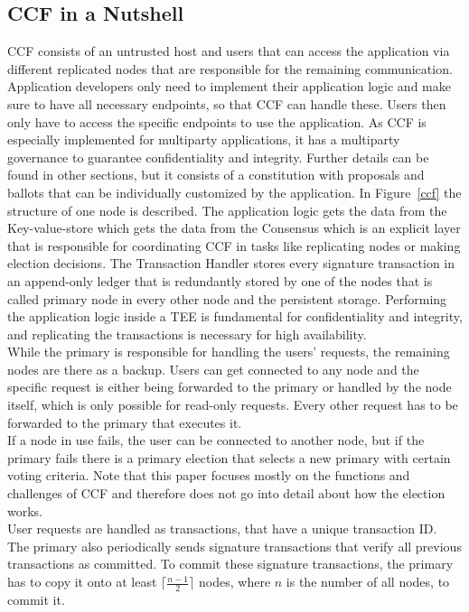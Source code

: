 \subsection{CCF in a Nutshell}
CCF consists of an untrusted host and users that can access the application via different replicated nodes that are responsible for the remaining communication. Application developers only need to implement their application logic and make sure to have all necessary endpoints, so that CCF can handle these. Users then only have to access the specific endpoints to use the application. As CCF is especially implemented for multiparty applications, it has a multiparty governance to guarantee confidentiality and integrity. Further details can be found in other sections, but it consists of a constitution with proposals and ballots that can be individually customized by the application. In Figure~\ref{ccf} the structure of one node is described. The application logic gets the data from the Key-value-store which gets the data from the Consensus which is an explicit layer that is responsible for coordinating CCF in tasks like replicating nodes or making election decisions.
  The Transaction Handler stores every signature transaction in an append-only ledger that is redundantly stored by one of the nodes that is called primary node in every other node and the persistent storage. Performing the application logic inside a TEE is fundamental for confidentiality and integrity, and replicating the transactions is necessary for high availability.\\ %
While the primary is responsible for handling the users' requests, the remaining nodes are there as a backup. Users can get connected to any node and the specific request is either being forwarded to the primary or handled by the node itself, which is only possible for read-only requests. Every other request has to be forwarded to the primary that executes it.\\
 If a node in use fails, the user can be connected to another node, but if the primary fails there is a primary election that selects a new primary with certain voting criteria. Note that this paper focuses mostly on the functions and challenges of CCF and therefore does not go into detail about how the election works. \\
 User requests are handled as transactions, that have a unique transaction ID. The primary also periodically sends signature transactions that verify all previous transactions as committed. To commit these signature transactions, the primary has to copy it onto at least $\lceil\frac{n-1}{2}\rceil$ nodes, where $n$ is the number of all nodes, to commit it.\\
